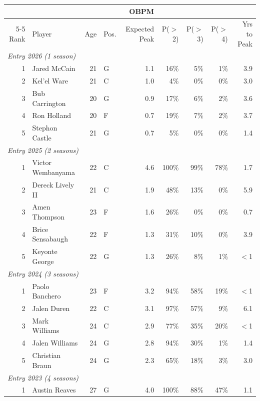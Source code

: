 \begin{table}[htbp]
  \centering\small
  \begin{tabular}{rlrlrrrrr}
    \toprule
     & & & & OBPM & & & & \\
    \cmidrule(lr){5-5}
    Rank & Player & Age & Pos. & Expected Peak & P($>$2) & P($>$3) & P($>$4) & Yrs to Peak \\
    \midrule
    \multicolumn{9}{l}{\textit{Entry 2026 (1 season)}} \\
    \midrule
    1 & Jared McCain & 21 & G & 1.1 & 16\% & 5\% & 1\% & 3.9 \\
    2 & Kel'el Ware & 21 & C & 1.0 & 4\% & 0\% & 0\% & 3.0 \\
    3 & Bub Carrington & 20 & G & 0.9 & 17\% & 6\% & 2\% & 3.6 \\
    4 & Ron Holland & 20 & F & 0.7 & 19\% & 7\% & 2\% & 3.7 \\
    5 & Stephon Castle & 21 & G & 0.7 & 5\% & 0\% & 0\% & 1.4 \\
    \midrule[0.4pt]
    \multicolumn{9}{l}{\textit{Entry 2025 (2 seasons)}} \\
    \midrule
    1 & Victor Wembanyama & 22 & C & 4.6 & 100\% & 99\% & 78\% & 1.7 \\
    2 & Dereck Lively II & 21 & C & 1.9 & 48\% & 13\% & 0\% & 5.9 \\
    3 & Amen Thompson & 23 & F & 1.6 & 26\% & 0\% & 0\% & 0.7 \\
    4 & Brice Sensabaugh & 22 & F & 1.3 & 31\% & 10\% & 0\% & 3.9 \\
    5 & Keyonte George & 22 & G & 1.3 & 26\% & 8\% & 1\% & $<$1 \\
    \midrule[0.4pt]
    \multicolumn{9}{l}{\textit{Entry 2024 (3 seasons)}} \\
    \midrule
    1 & Paolo Banchero & 23 & F & 3.2 & 94\% & 58\% & 19\% & $<$1 \\
    2 & Jalen Duren & 22 & C & 3.1 & 97\% & 57\% & 9\% & 6.1 \\
    3 & Mark Williams & 24 & C & 2.9 & 77\% & 35\% & 20\% & $<$1 \\
    4 & Jalen Williams & 24 & G & 2.8 & 94\% & 30\% & 1\% & 1.4 \\
    5 & Christian Braun & 24 & G & 2.3 & 65\% & 18\% & 3\% & 3.0 \\
    \midrule[0.4pt]
    \multicolumn{9}{l}{\textit{Entry 2023 (4 seasons)}} \\
    \midrule
    1 & Austin Reaves & 27 & G & 4.0 & 100\% & 88\% & 47\% & 1.1 \\

\end{tabular}
\end{table}
